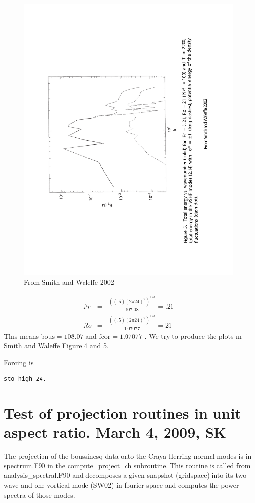 \documentclass[12pt]{article}
\begin{document}
\begin{figure}
\begin{center}
\includegraphics[angle=-90,width=4.in]{SW02Fig5}
\caption{From Smith and Waleffe 2002}
\label{fig:SW02Fig5}
\end{center}
\end{figure}


\begin{eqnarray}
Fr &=& \frac{\left((.5)(2 \pi 24)^{2}\right)^{1/3}}{107.08}= .21 \\ 
Ro &=& \frac{\left((.5)(2 \pi 24)^{2}\right)^{1/3}}{1.07077} = 21
\end{eqnarray} 
This means $\text{bous}=108.07$ and $\text{fcor} =1.07077 $ . We try
to produce the plots in Smith and Waleffe Figure 4 and 5.

Forcing is
\begin{verbatim}
sto_high_24.
\end{verbatim}

\section{Test of projection routines in unit aspect ratio.  March 4, 2009, SK}

The projection of the boussinesq data onto the Craya-Herring normal
modes is in spectrum.F90 in the compute\_project\_ch subroutine. This
routine is called from analysis\_spectral.F90 and decomposes a given
snapshot (gridspace) into its two wave and one vortical mode (SW02) in fourier space and computes the power spectra of those modes.
\end{document}
